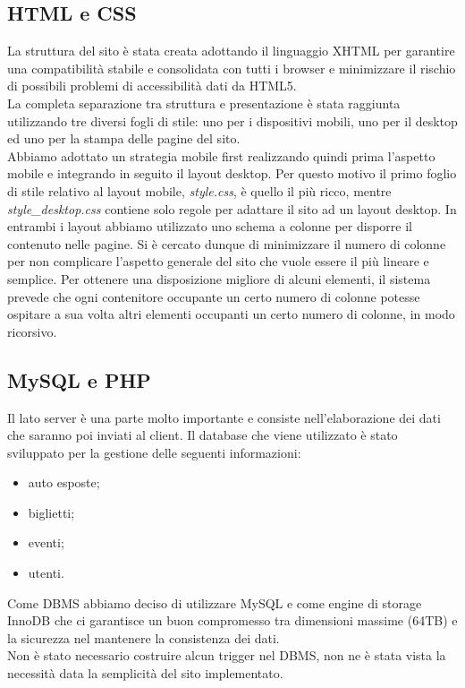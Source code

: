 \subsection{HTML e CSS}
La struttura del sito è stata creata adottando il linguaggio XHTML per garantire una compatibilità stabile e consolidata con tutti i browser e minimizzare il rischio di possibili problemi di accessibilità dati da HTML5.\\
La completa separazione tra struttura e presentazione è stata raggiunta utilizzando tre diversi fogli di stile: uno per i dispositivi mobili, uno per il desktop ed uno per la stampa delle pagine del sito.\\
 Abbiamo adottato un strategia mobile first realizzando quindi prima l'aspetto mobile e integrando in seguito il layout desktop. Per questo motivo il primo foglio di stile relativo al layout mobile, \textit{style.css}, è quello il più ricco, mentre \textit{style\_desktop.css} contiene solo regole per adattare il sito ad un layout desktop. In entrambi i layout abbiamo utilizzato uno schema a colonne per disporre il contenuto nelle pagine. Si è cercato dunque di minimizzare il numero di colonne per non complicare l'aspetto generale del sito che vuole essere il più lineare e semplice. Per ottenere una disposizione migliore di alcuni elementi, il sistema prevede che ogni contenitore occupante un certo numero di colonne potesse ospitare a sua volta altri elementi occupanti un certo numero di colonne, in modo ricorsivo.

\subsection{MySQL e PHP}
Il lato server è una parte molto importante e consiste nell'elaborazione dei dati che saranno poi inviati al client. Il database che viene utilizzato è stato sviluppato per la gestione delle seguenti informazioni:
\begin{itemize}
	\item auto esposte;
	\item biglietti;
	\item eventi;
	\item utenti.
\end{itemize}
Come DBMS abbiamo deciso di utilizzare MySQL e come engine di storage InnoDB che ci garantisce un buon compromesso tra dimensioni massime (64TB) e la sicurezza nel mantenere la consistenza dei dati.\\
Non è stato necessario costruire alcun trigger nel DBMS, non ne è stata vista la necessità data la semplicità del sito implementato.

